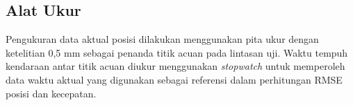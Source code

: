 \subsection{Alat Ukur}

Pengukuran data aktual posisi dilakukan menggunakan pita ukur dengan ketelitian 0,5 mm sebagai penanda titik acuan pada lintasan uji.
Waktu tempuh kendaraan antar titik acuan diukur menggunakan \emph{stopwatch} untuk memperoleh data waktu aktual yang digunakan sebagai referensi dalam perhitungan RMSE posisi dan kecepatan.
